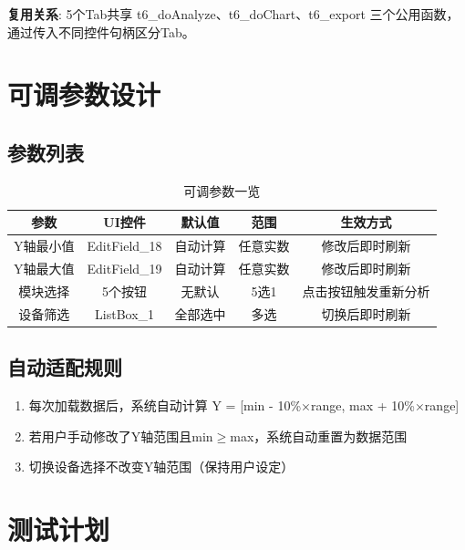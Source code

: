 \documentclass[12pt,a3paper]{ctexart}
\begin{document}
\textbf{复用关系}: 5个Tab共享 t6\_doAnalyze、t6\_doChart、t6\_export 三个公用函数，通过传入不同控件句柄区分Tab。

\section{可调参数设计}

\subsection{参数列表}

\begin{table}[H]
\centering
\caption{可调参数一览}
\begin{tabular}{c|c|c|c|c}
\toprule
\textbf{参数} & \textbf{UI控件} & \textbf{默认值} & \textbf{范围} & \textbf{生效方式} \\
\midrule
Y轴最小值 & EditField\_18 & 自动计算 & 任意实数 & 修改后即时刷新 \\
Y轴最大值 & EditField\_19 & 自动计算 & 任意实数 & 修改后即时刷新 \\
模块选择 & 5个按钮 & 无默认 & 5选1 & 点击按钮触发重新分析 \\
设备筛选 & ListBox\_1 & 全部选中 & 多选 & 切换后即时刷新 \\
\bottomrule
\end{tabular}
\end{table}

\subsection{自动适配规则}

\begin{enumerate}
    \item 每次加载数据后，系统自动计算 Y = [min - 10\%$\times$range, max + 10\%$\times$range]
    \item 若用户手动修改了Y轴范围且min$\ge$max，系统自动重置为数据范围
    \item 切换设备选择不改变Y轴范围（保持用户设定）
\end{enumerate}

\section{测试计划}
\end{document}
